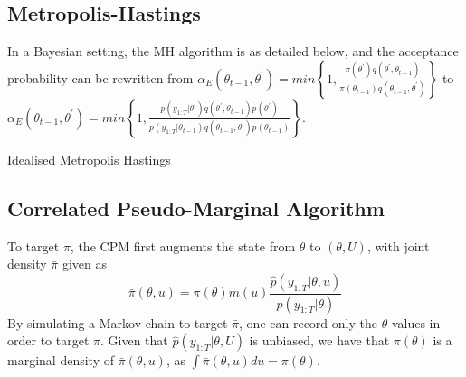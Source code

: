 \documentclass{article}
\makeatletter
\def\BState{\State\hskip-\ALG@thistlm}
\makeatother
\begin{document}
\subsection{Metropolis-Hastings}
In a Bayesian setting, the MH algorithm is as detailed below, and the acceptance probability can be rewritten from $\alpha_E(\theta_{t-1}, \theta^\prime) = min\left\{1,  \frac{
                \pi(\theta^\prime) q(\theta^\prime, \theta_{t-1})}
                {\pi(\theta_{t-1}) q(\theta_{t-1}, \theta^\prime)}\right\}$ to
 $ \alpha_E(\theta_{t-1}, \theta^\prime) = min\left\{1,  \frac{
                p(y_{1:T}| \theta^\prime) q(\theta^\prime, \theta_{t-1})p(\theta^\prime)}
                {p(y_{1:T}| \theta_{t-1}) q(\theta_{t-1}, \theta^\prime)p(\theta_{t-1})}
\right\} $.

\begin{algorithm}[H]
\caption{Idealised Metropolis Hastings}\label{euclid}
\end{algorithm}


\subsection{Correlated Pseudo-Marginal Algorithm}
To target $\pi$, the CPM first augments the state from $\theta$ to $(\theta, U)$, with joint density $\bar{\pi}$ given as
$$\bar{\pi}(\theta, u) = \pi(\theta)m(u)\frac{\hat{p}(y_{1:T}| \theta, u)}{p(y_{1:T}| \theta)}$$
By simulating a Markov chain to target $\bar{\pi}$, one can record only the $\theta$ values in order to target $\pi$. Given that $\hat{p} (y_{1:T} | \theta, U)$ is unbiased, we have that $\pi(\theta)$ is a marginal density of $\bar{\pi} (\theta, u)$, as $\int \bar{\pi}(\theta,u)du = \pi(\theta)$. \\
\end{document}
